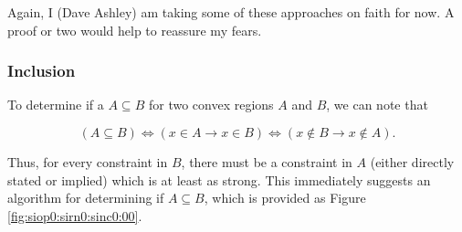 Again, I (Dave Ashley) am taking some of these approaches on faith for now.
A proof or two would help to reassure my fears.


\subsubsection{Inclusion}
\label{siop0:sirn0:sinc0}

To determine if a $A \subseteq B$ for two convex regions
$A$ and $B$, we can note that

\begin{equation}
\label{eq:siop0:sirn0:sinc0:00} 
(A \subseteq B) 
\Longleftrightarrow
(x \in A \rightarrow x \in B)
\Longleftrightarrow
(x \notin B \rightarrow x \notin A) .
\end{equation}

\noindent{}Thus, for every constraint in $B$, there must be
a constraint in $A$ (either directly stated or implied)
which is at least as strong.  This immediately suggests
an algorithm for determining if $A \subseteq B$, which is
provided as Figure \ref{fig:siop0:sirn0:sinc0:00}.

